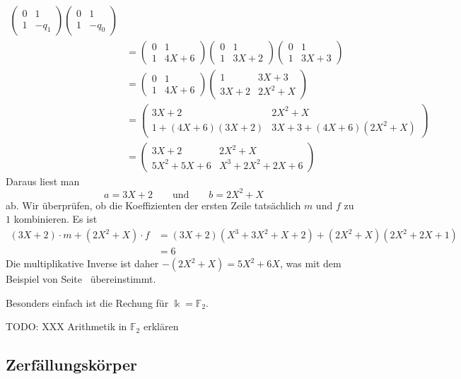 \begin{beispiel}
\begin{align*}
\begin{pmatrix}0&1\\1&-q_1\end{pmatrix}
\begin{pmatrix}0&1\\1&-q_0\end{pmatrix}
\\
&=
\begin{pmatrix}
0&1\\
1&4X+6
\end{pmatrix}
\begin{pmatrix}
0&1\\
1&3X+2
\end{pmatrix}
\begin{pmatrix}
0&1\\
1&3X+3
\end{pmatrix}
\\
&=
\begin{pmatrix}
0&1\\
1&4X+6
\end{pmatrix}
\begin{pmatrix}
   1&3X+3\\
3X+2&2X^2 + X
\end{pmatrix}
\\
&=
\begin{pmatrix}
3X+2           &2X^2+X\\
1+(4X+6)(3X+2) &3X+3 + (4X+6)(2X^2+X)
\end{pmatrix}
\\
&=
\begin{pmatrix}
     3X+2 & 2X^2     +X\\
5X^2+5X+6 &  X^3+2X^2+2X+6
\end{pmatrix}
\end{align*}
Daraus liest man
\[
a
=
3X+2
\qquad\text{und}\qquad
b
=
2X^2+X
\]
ab.
Wir überprüfen, ob die Koeffizienten der ersten Zeile tatsächlich $m$ und $f$
zu $1$ kombinieren.
Es ist
\begin{align*}
(3X+2)\cdot m + (2X^2+X)\cdot f
&= 
(3X+2)
(X^3+3X^2+X+2)
+
(2X^2+X)
(2X^2+2X+1)
\\
&=
6
\end{align*}
Die multiplikative Inverse ist daher
$-(2X^2 + X) = 5X^2+6X$,
was mit dem Beispiel von
Seite~\pageref{buch:endlichekoerper:beispiel:inversemitmatrix}
übereinstimmt.
\end{beispiel}

Besonders einfach ist die Rechung für $\Bbbk=\mathbb{F}_2$.

TODO: XXX Arithmetik in $\mathbb{F}_2$ erklären

\subsection{Zerfällungskörper}





